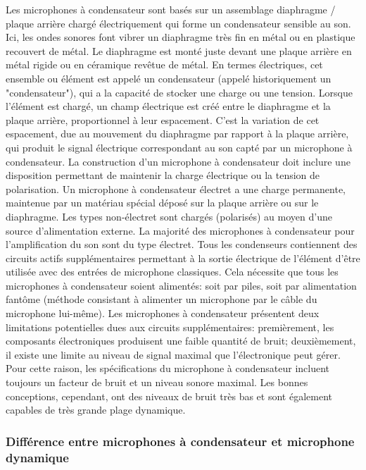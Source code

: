 \documentclass[a4paper, 12pt]{book}
\begin{document}
Les microphones à condensateur sont basés sur un assemblage diaphragme / plaque arrière chargé électriquement qui forme un condensateur sensible au son. Ici, les ondes sonores font vibrer un diaphragme très fin en métal ou en plastique recouvert de métal. Le diaphragme est monté juste devant une plaque arrière en métal rigide ou en céramique revêtue de métal. En termes électriques, cet ensemble ou élément est appelé un condensateur (appelé historiquement un "condensateur"), qui a la capacité de stocker une charge ou une tension. Lorsque l'élément est chargé, un champ électrique est créé entre le diaphragme et la plaque arrière, proportionnel à leur espacement. C’est la variation de cet espacement, due au mouvement du diaphragme par rapport à la plaque arrière, qui produit le signal électrique correspondant au son capté par un microphone à condensateur. La construction d’un microphone à condensateur doit inclure une disposition permettant de maintenir la charge électrique ou la tension de polarisation. Un microphone à condensateur électret a une charge permanente, maintenue par un matériau spécial déposé sur la plaque arrière ou sur le diaphragme. Les types non-électret sont chargés (polarisés) au moyen d'une source d'alimentation externe. La majorité des microphones à condensateur pour l’amplification du son sont du type électret. Tous les condenseurs contiennent des circuits actifs supplémentaires permettant à la sortie électrique de l'élément d'être utilisée avec des entrées de microphone classiques. Cela nécessite que tous les microphones à condensateur soient alimentés: soit par piles, soit par alimentation fantôme (méthode consistant à alimenter un microphone par le câble du microphone lui-même). Les microphones à condensateur présentent deux limitations potentielles dues aux circuits supplémentaires: premièrement, les composants électroniques produisent une faible quantité de bruit; deuxièmement, il existe une limite au niveau de signal maximal que l’électronique peut gérer. Pour cette raison, les spécifications du microphone à condensateur incluent toujours un facteur de bruit et un niveau sonore maximal. Les bonnes conceptions, cependant, ont des niveaux de bruit très bas et sont également capables de très grande plage dynamique.

\subsubsection{Différence entre microphones à condensateur et microphone dynamique}
\end{document}
